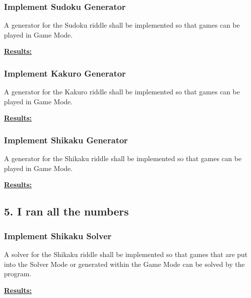 \documentclass{article}
\begin{document}
	\subsubsection*{Implement Sudoku Generator}
	
	A generator for the Sudoku riddle shall be implemented so that games can be played in Game Mode.
	
	\begin{framed}
		\textbf{\underline{Results:}}\\
	\end{framed}
	
	\subsubsection*{Implement Kakuro Generator}
	
	A generator for the Kakuro riddle shall be implemented so that games can be played in Game Mode.
	
	\begin{framed}
		\textbf{\underline{Results:}}\\
	\end{framed}

	\subsubsection*{Implement Shikaku Generator}
	
	A generator for the Shikaku riddle shall be implemented so that games can be played in Game Mode.
	
	\begin{framed}
		\textbf{\underline{Results:}}\\
	\end{framed}
	
	\newpage
	
	\subsection*{5. I ran all the numbers}
	
	\subsubsection*{Implement Shikaku Solver}
	
	A solver for the Shikaku riddle shall be implemented so that games that are put into the Solver Mode or generated within the Game Mode can be solved by the program.
	
	\begin{framed}
		\textbf{\underline{Results:}}\\
	\end{framed}
	
\end{document}
